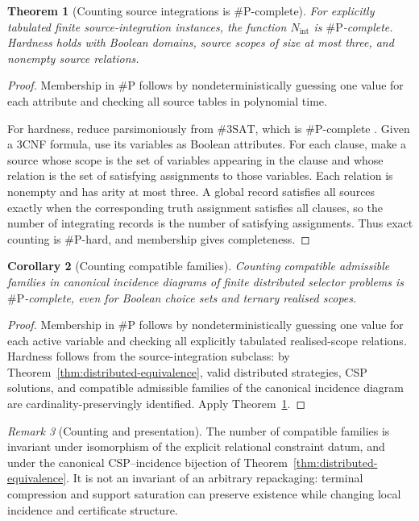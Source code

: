 \documentclass[11pt]{article}
\theoremstyle{plain}
\newtheorem{theorem}{Theorem}[section]
\newtheorem{corollary}[theorem]{Corollary}
\theoremstyle{definition}
\theoremstyle{remark}
\newtheorem{remark}[theorem]{Remark}
\begin{document}
\begin{theorem}[Counting source integrations is $\#\mathrm P$-complete]
\label{thm:source-integration-sharpP}
For explicitly tabulated finite source-integration instances, the function
$N_{\mathrm{int}}$ is $\#\mathrm P$-complete. Hardness holds with Boolean
domains, source scopes of size at most three, and nonempty source relations.
\end{theorem}

\begin{proof}
Membership in $\#\mathrm P$ follows by nondeterministically guessing one value
for each attribute and checking all source tables in polynomial time.

For hardness, reduce parsimoniously from $\#3\mathrm{SAT}$, which is
$\#\mathrm P$-complete \cite{valiant}. Given a 3CNF formula,
use its variables as Boolean attributes. For each clause, make a source whose
scope is the set of variables appearing in the clause and whose relation is
the set of satisfying assignments to those variables. Each relation is nonempty
and has arity at most three. A global record satisfies all sources exactly when
the corresponding truth assignment satisfies all clauses, so the number of
integrating records is the number of satisfying assignments. Thus exact counting
is $\#\mathrm P$-hard, and membership gives completeness.
\end{proof}

\begin{corollary}[Counting compatible families]
\label{cor:counting-compatible-families}
Counting compatible admissible families in canonical incidence diagrams of
finite distributed selector problems is $\#\mathrm P$-complete, even for Boolean
choice sets and ternary realised scopes.
\end{corollary}

\begin{proof}
Membership in $\#\mathrm P$ follows by nondeterministically guessing one value
for each active variable and checking all explicitly tabulated realised-scope
relations. Hardness follows from the source-integration subclass: by
Theorem~\ref{thm:distributed-equivalence}, valid distributed strategies, CSP
solutions, and compatible admissible families of the canonical incidence diagram
are cardinality-preservingly identified. Apply
Theorem~\ref{thm:source-integration-sharpP}.
\end{proof}

\begin{remark}[Counting and presentation]
The number of compatible families is invariant under isomorphism of the explicit
relational constraint datum, and under the canonical CSP--incidence bijection of
Theorem~\ref{thm:distributed-equivalence}. It is not an invariant of an
arbitrary repackaging: terminal compression and support saturation can preserve
existence while changing local incidence and certificate structure.
\end{remark}
\end{document}
